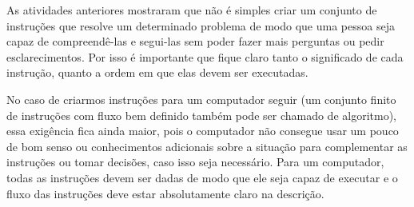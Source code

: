 \label{comp-arr1}

As atividades anteriores mostraram que não é simples criar um conjunto de instruções que resolve um determinado problema de modo que uma pessoa seja capaz de compreendê-las e segui-las sem poder fazer mais perguntas ou pedir esclarecimentos. Por isso é importante que fique claro tanto o significado de cada instrução, quanto a ordem em que elas devem ser executadas.

No caso de criarmos instruções para um computador seguir (um conjunto finito de instruções com fluxo bem definido também pode ser chamado de algoritmo), essa exigência fica ainda maior, pois o computador não consegue usar um pouco de bom senso ou conhecimentos adicionais sobre a situação para complementar as instruções ou tomar decisões, caso isso seja necessário. Para um computador, todas as instruções devem ser dadas de modo que ele seja capaz de executar e o fluxo das instruções deve estar absolutamente claro na descrição.

